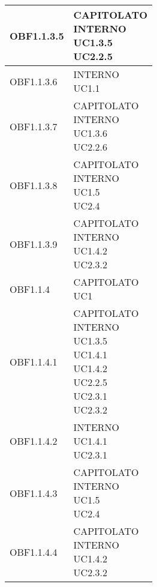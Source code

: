 \documentclass{scalatekids-article}
\begin{document}
\begin{longtable}[H]{|p{5.5cm}|p{5.5cm}|}
  \hline
  OBF1.1.3.5 & \multiLineCell[t]{CAPITOLATO\\INTERNO\\UC1.3.5\\UC2.2.5\\}\\
  \hline
  OBF1.1.3.6 & \multiLineCell[t]{INTERNO\\UC1.1\\}\\
  \hline
  OBF1.1.3.7 & \multiLineCell[t]{CAPITOLATO\\INTERNO\\UC1.3.6\\UC2.2.6\\}\\
  \hline
  OBF1.1.3.8 & \multiLineCell[t]{CAPITOLATO\\INTERNO\\UC1.5\\UC2.4\\}\\
  \hline
  OBF1.1.3.9 & \multiLineCell[t]{CAPITOLATO\\INTERNO\\UC1.4.2\\UC2.3.2\\}\\
  \hline
  OBF1.1.4 & \multiLineCell[t]{CAPITOLATO\\UC1\\}\\
  \hline
  OBF1.1.4.1 & \multiLineCell[t]{CAPITOLATO\\INTERNO\\UC1.3.5\\UC1.4.1\\UC1.4.2\\UC2.2.5\\UC2.3.1\\UC2.3.2\\}\\
  \hline
  OBF1.1.4.2 & \multiLineCell[t]{INTERNO\\UC1.4.1\\UC2.3.1\\}\\
  \hline
  OBF1.1.4.3 & \multiLineCell[t]{CAPITOLATO\\INTERNO\\UC1.5\\UC2.4\\}\\
  \hline
  OBF1.1.4.4 & \multiLineCell[t]{CAPITOLATO\\INTERNO\\UC1.4.2\\UC2.3.2\\}\\

\end{longtable}
\end{document}
